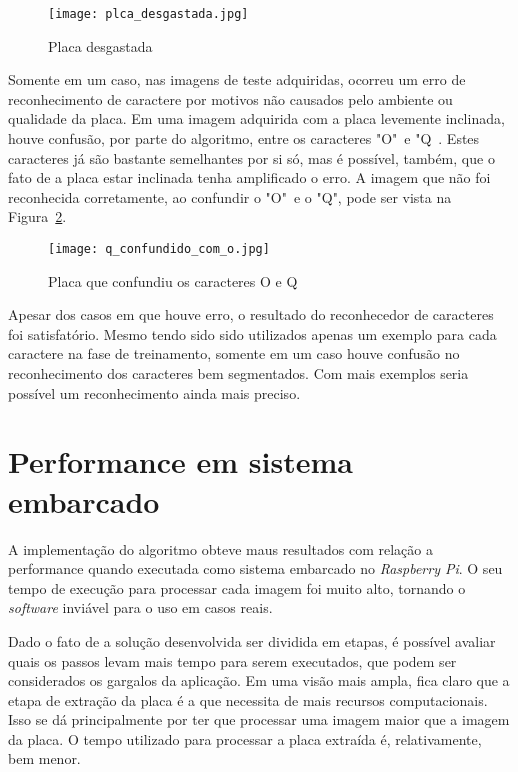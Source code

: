 \begin{figure}[H]
	\centering
	\texttt{[image: plca\_desgastada.jpg]}
	\caption{Placa desgastada}
	\label{fig:placa_desgastada}
\end{figure}

Somente em um caso, nas imagens de teste adquiridas, ocorreu um erro de reconhecimento de caractere por motivos não causados pelo ambiente ou qualidade da placa. Em uma imagem adquirida com a placa levemente inclinada, houve confusão, por parte do algoritmo, entre os caracteres "O"~e "Q~. Estes caracteres já são bastante semelhantes por si só, mas é possível, também, que o fato de a placa estar inclinada tenha amplificado o erro. A imagem que não foi reconhecida corretamente, ao confundir o "O"~e o "Q", pode ser vista na Figura~\ref{fig:q_confundido_com_o}.

\begin{figure}[H]
	\centering
	\texttt{[image: q\_confundido\_com\_o.jpg]}
	\caption{Placa que confundiu os caracteres O e Q}
	\label{fig:q_confundido_com_o}
\end{figure}

Apesar dos casos em que houve erro, o resultado do reconhecedor de caracteres foi satisfatório. Mesmo tendo sido sido utilizados apenas um exemplo para cada caractere na fase de treinamento, somente em um caso houve confusão no reconhecimento dos caracteres bem segmentados. Com mais exemplos seria possível um reconhecimento ainda mais preciso.

\section{Performance em sistema embarcado}
\label{sec:performance_resultados}

A implementação do algoritmo obteve maus resultados com relação a
performance quando executada como sistema embarcado no \emph{Raspberry Pi}. 
O seu tempo de execução para processar cada imagem foi muito alto, tornando o \emph{software} 
inviável para o uso em casos reais.

Dado o fato de a solução desenvolvida ser dividida em etapas, é possível avaliar
quais os passos levam mais tempo para serem executados, que podem ser
considerados os gargalos da aplicação. Em uma visão mais ampla, fica claro que a
etapa de extração da placa é a que necessita de mais recursos computacionais.
Isso se dá principalmente por ter que processar uma imagem maior que a imagem da
placa. O tempo utilizado para processar a placa extraída é, relativamente, bem
menor.

